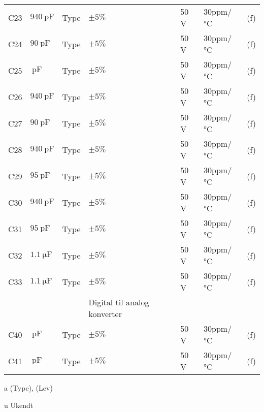 \begin{table}[h!]
\begin{threeparttable}
\begin{tabular}{ l l l l l l l }
C23 & $\SI{940}{\pico\farad}$ & Type & $\pm 5\%$ & 50 \si{\volt} & 30ppm/\si{\celsius} & (f)\\
C24 & $\SI{90}{\pico\farad}$ & Type & $\pm 5\%$ & 50 \si{\volt} & 30ppm/\si{\celsius} & (f)\\
C25 & $\SI{}{\pico\farad}$ & Type & $\pm 5\%$ & 50 \si{\volt} & 30ppm/\si{\celsius} & (f)\\
C26 & $\SI{940}{\pico\farad}$ & Type & $\pm 5\%$ & 50 \si{\volt} & 30ppm/\si{\celsius} & (f)\\
C27 & $\SI{90}{\pico\farad}$ & Type & $\pm 5\%$ & 50 \si{\volt} & 30ppm/\si{\celsius} & (f)\\
C28 & $\SI{940}{\pico\farad}$ & Type & $\pm 5\%$ & 50 \si{\volt} & 30ppm/\si{\celsius} & (f)\\
C29 & $\SI{95}{\pico\farad}$ & Type & $\pm 5\%$ & 50 \si{\volt} & 30ppm/\si{\celsius} & (f)\\
C30 & $\SI{940}{\pico\farad}$ & Type & $\pm 5\%$ & 50 \si{\volt} & 30ppm/\si{\celsius} & (f)\\
C31 & $\SI{95}{\pico\farad}$ & Type & $\pm 5\%$ & 50 \si{\volt} & 30ppm/\si{\celsius} & (f)\\
C32 & $\SI{1.1}{\micro\farad}$ & Type & $\pm 5\%$ & 50 \si{\volt} & 30ppm/\si{\celsius} & (f)\\
C33 & $\SI{1.1}{\micro\farad}$ & Type & $\pm 5\%$ & 50 \si{\volt} & 30ppm/\si{\celsius} & (f)\\
\midrule
& & & Digital til analog konverter & & & \\
C40 & $\SI{}{\pico\farad}$ & Type & $\pm 5\%$ & 50 \si{\volt} & 30ppm/\si{\celsius} & (f)\\
C41 & $\SI{}{\pico\farad}$ & Type & $\pm 5\%$ & 50 \si{\volt} & 30ppm/\si{\celsius} & (f)\\
\hline
\bottomrule
\end{tabular}
\begin{tablenotes}
\item[a] (Type), (Lev)
\item[u] Ukendt
\end{tablenotes}
\end{threeparttable}
\end{table} 
